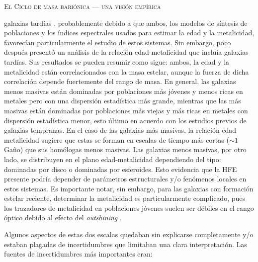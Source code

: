 \documentclass[xcolor=dvipsnames,4pt,hyperref={colorlinks,citecolor=black,linkcolor=black,urlcolor=black}]{beamer}
\begin{document}
\begin{frame}[allowframebreaks]{\textsc{El Ciclo de masa bariónica --- una visión empírica}}
\begin{description}
galaxias tardías \citep{Proctor2002, Terlevich2002}, probablemente debido a que ambos, los modelos
de síntesis de poblaciones y los índices espectrales usados para estimar la edad y la metalicidad,
favorecían particularmente el estudio de estos sistemas.
%
Sin embargo, poco después \citet{Gallazzi2005} presentó un análisis de la relación edad-metalicidad
que incluía galaxias tardías. Sus resultados se pueden resumir como sigue: ambos, la edad y la
metalicidad están correlacionados con la masa estelar, aunque la fuerza de dicha correlación depende
fuertemente del rango de masa. En general, las galaxias menos masivas están dominadas por
poblaciones más jóvenes y menos ricas en metales pero con una dispersión estadística más grande,
mientras que las más masivas están dominadas por poblaciones más viejas y más ricas en metales con
dispersión estadística menor, esto último en acuerdo con los estudios previos de galaxias tempranas.
En el caso de las galaxias más masivas, la relación edad-metalicidad sugiere que estas se forman en
escalas de tiempo más cortas ($\sim1\,$Gaño) que sus homólogas menos masivas.
Las galaxias menos masivas, por otro lado, se distribuyen en el plano edad-metalicidad dependiendo
del tipo: dominadas por disco o dominadas por esferoides. Esto evidencia que la HFE presente podría
depender de parámetros estructurales y/o fenómenos locales en estos sistemas.
Es importante notar, sin embargo, para las galaxias con formación estelar reciente, determinar la
metalicidad es particularmente complicado, pues los trazadores de metalicidad en poblaciones jóvenes
suelen ser débiles en el rango óptico debido al efecto del \emph{outshining}
\citep[e.\,g.,][]{Conroy2013a}.
%
\end{description}

Algunos aspectos de estas dos escalas quedaban sin explicarse completamente y/o estaban plagadas de
incertidumbres que limitaban una clara interpretación. Las fuentes de incertidumbres más importantes
eran:


\end{frame}
\end{document}
